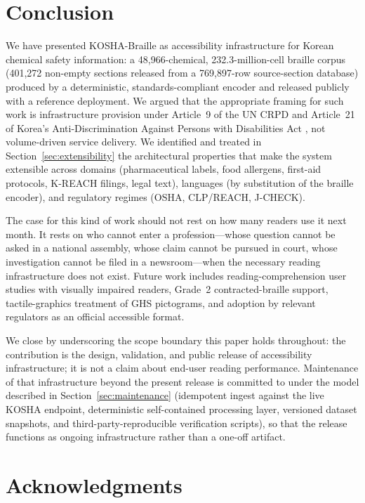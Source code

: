 \documentclass[journal]{IEEEtran}
\begin{document}
\section{Conclusion}
\label{sec:conclusion}

We have presented KOSHA-Braille as accessibility infrastructure for Korean chemical safety information: a 48{,}966-chemical, 232.3-million-cell braille corpus (401{,}272 non-empty sections released from a 769{,}897-row source-section database) produced by a deterministic, standards-compliant encoder and released publicly with a reference deployment. We argued that the appropriate framing for such work is infrastructure provision under Article~9 of the UN CRPD \cite{crpd} and Article~21 of Korea's Anti-Discrimination Against Persons with Disabilities Act \cite{kdpa}, not volume-driven service delivery. We identified and treated in Section~\ref{sec:extensibility} the architectural properties that make the system extensible across domains (pharmaceutical labels, food allergens, first-aid protocols, K-REACH filings, legal text), languages (by substitution of the braille encoder), and regulatory regimes (OSHA, CLP/REACH, J-CHECK).

The case for this kind of work should not rest on how many readers use it next month. It rests on who cannot enter a profession---whose question cannot be asked in a national assembly, whose claim cannot be pursued in court, whose investigation cannot be filed in a newsroom---when the necessary reading infrastructure does not exist. Future work includes reading-comprehension user studies with visually impaired readers, Grade~2 contracted-braille support, tactile-graphics treatment of GHS pictograms, and adoption by relevant regulators as an official accessible format.

We close by underscoring the scope boundary this paper holds throughout: the contribution is the design, validation, and public release of accessibility infrastructure; it is not a claim about end-user reading performance. Maintenance of that infrastructure beyond the present release is committed to under the model described in Section~\ref{sec:maintenance} (idempotent ingest against the live KOSHA endpoint, deterministic self-contained processing layer, versioned dataset snapshots, and third-party-reproducible verification scripts), so that the release functions as ongoing infrastructure rather than a one-off artifact.

\section*{Acknowledgments}
\end{document}
